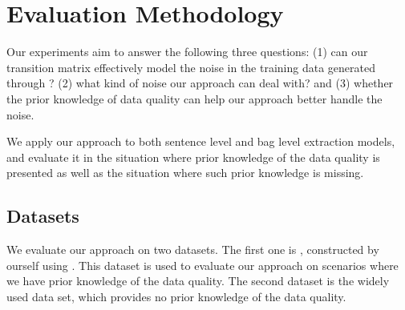 \section{Evaluation Methodology}

Our experiments aim to answer the following three questions: (1) can our
transition matrix effectively model the noise in the training data generated
through \DS? (2) what kind of noise our approach can deal with? and (3)
whether the prior knowledge of data quality can help our approach better
handle the noise.

We apply our approach to both sentence level and bag level
extraction models, and evaluate it in the situation where prior knowledge of
the data quality is presented as well as the situation where such prior
knowledge is missing.


\subsection{Datasets}
We evaluate our approach on two datasets. The first one is  \TimeRE, constructed by ourself using \DS.
This dataset is used to evaluate our approach on scenarios where we
have prior knowledge of the data quality. The second dataset is the widely used \EntityRE data set\todo{\cite{}},
which provides no prior knowledge of the data quality.


